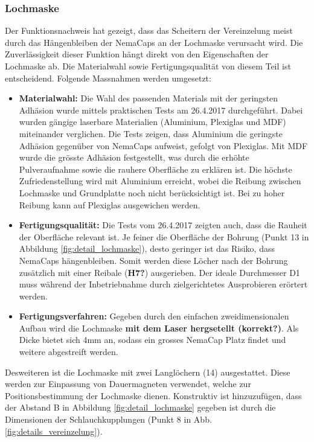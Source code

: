 \subsubsection{Lochmaske}
Der Funktionsnachweis hat gezeigt, dass das Scheitern der Vereinzelung meist durch das Hängenbleiben der NemaCaps an der Lochmaske verursacht wird. Die Zuverlässigkeit dieser Funktion hängt direkt von den Eigenschaften der Lochmaske ab. Die Materialwahl sowie Fertigungsqualität von diesem Teil ist entscheidend. 
\newline
Folgende Massnahmen werden umgesetzt:
\begin{itemize}
	\item \textbf{Materialwahl:} Die Wahl des passenden Materials mit der geringsten Adhäsion wurde mittels praktischen Tests am 26.4.2017 durchgeführt. Dabei wurden gängige laserbare Materialien (Aluminium, Plexiglas und MDF) miteinander verglichen. Die Tests zeigen, dass Aluminium die geringste Adhäsion gegenüber von NemaCaps aufweist, gefolgt von Plexiglas. Mit MDF wurde die grösste Adhäsion festgestellt, was durch die erhöhte Pulveraufnahme sowie die rauhere Oberfläche zu erklären ist. 
	Die höchste Zufriedenstellung wird mit Aluminium erreicht, wobei die Reibung zwischen Lochmaske und Grundplatte noch nicht berücksichtigt ist. Bei zu hoher Reibung kann auf Plexiglas ausgewichen werden.
	
	\item \textbf{Fertigungsqualität:} Die Tests vom 26.4.2017 zeigten auch, dass die Rauheit der Oberfläche relevant ist. Je feiner die Oberfläche der Bohrung (Punkt 13 in Abbildung \ref{fig:detail_lochmaske}), desto geringer ist das Risiko, dass NemaCaps hängenbleiben. Somit werden diese Löcher nach der Bohrung zusätzlich mit einer Reibale (\textbf{H7?}) ausgerieben. Der ideale Durchmesser D1 muss während der Inbetriebnahme durch zielgerichtetes Ausprobieren erörtert werden.
	
	\item \textbf{Fertigungsverfahren:} Gegeben durch den einfachen zweidimensionalen Aufbau wird die Lochmaske \textbf{mit dem Laser hergsetellt (korrekt?)}. Als Dicke bietet sich 4mm an, sodass ein grosses NemaCap Platz findet und weitere abgestreift werden.
\end{itemize}
Desweiteren ist die Lochmaske mit zwei Langlöchern (14) ausgestattet. Diese werden zur Einpassung von Dauermagneten verwendet, welche zur Positionsbestimmung der Lochmaske dienen. Konstruktiv ist hinzuzufügen, dass der Abstand B in Abbildung \ref{fig:detail_lochmaske} gegeben ist durch die Dimensionen der Schlauchkupplungen (Punkt 8 in Abb. \ref{fig:details_vereinzelung}).
